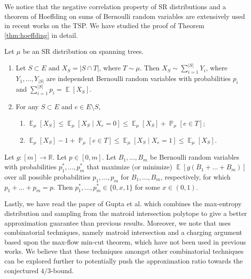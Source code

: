 \documentclass[letterpaper, reqno,12pt]{article}
\newcommand{\RR}{\mathbb{R}}
\newcommand{\PP}{\mathop{{}\mathbb{P}}}
\newcommand{\EE}{\mathop{{}\mathbb{E}}}
\begin{document}
We notice that the negative correlation property of SR distributions and a theorem of Hoeffding on sums of Bernoulli random variables are extensively used in recent works on the TSP. We have studied the proof of Theorem \ref{thm:hoeffding} in detail.

\begin{theorem} \label{thm:neg-corr}
  Let $\mu$ be an SR distribution on spanning trees.
  \begin{enumerate}[label=(\alph*), itemsep=0pt]
    \item Let $S \subset E$ and $X_S = |S \cap T|$, where $T \sim \mu$. Then $X_S \sim \sum_{i = 1}^{|S|} Y_i$, where $Y_1, \ldots, Y_{|S|}$ are independent Bernoulli random variables with probabilities $p_i$ and $\sum_{i = 1}^{|S|} p_i = \EE[X_S]$.
    \item For any $S \subset E$ and $e \in E \setminus S$,
    \begin{enumerate}[label=\roman*., itemsep=0pt]
      \item $\EE_\mu[X_S] \leq \EE_\mu[X_S \mid X_e = 0] \leq \EE_\mu[X_S] + \PP_\mu[e \in T]$;
      \item $\EE_\mu[X_S] - 1 + \PP_\mu[e \in T] \leq \EE_\mu[X_S \mid X_e = 1] \leq \EE_\mu[X_S]$.
    \end{enumerate}
  \end{enumerate}
\end{theorem}

\begin{theorem} \label{thm:hoeffding}
  Let $g : [m] \to \RR$. Let $p \in [0, m]$. Let $B_1, \ldots, B_m$ be Bernoulli random variables with probabilities $p_1^*, \ldots, p_m^*$ that maximize (or minimize) $\EE[g(B_1 + \ldots + B_m)]$ over all possible probabilities $p_1, \ldots, p_m$ for $B_1, \ldots, B_m$, respectively, for which $p_1 + \ldots + p_m = p$. Then $p_1^*, \ldots, p_m^* \in \{ 0, x, 1 \}$ for some $x \in (0, 1)$.
\end{theorem}

Lastly, we have read the paper of Gupta et al. \cite{gupta2021matroid} which combines the max-entropy distribution and sampling from the matroid intersection polytope to give a better approximation guarantee than previous results. Moreover, we note that \cite{gupta2021matroid} uses combinatorial techniques, namely matroid intersection and a charging argument based upon the max-flow min-cut theorem, which have not been used in previous works. We believe that these techniques amongst other combinatorial techniques can be explored further to potentially push the approximation ratio towards the conjectured $4/3$-bound.
\end{document}
